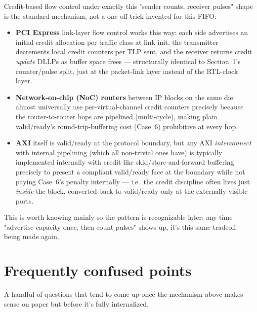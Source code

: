 \documentclass[12pt]{article}
\begin{document}
Credit-based flow control under exactly this "sender counts, receiver
pulses" shape is the standard mechanism, not a one-off trick invented for
this FIFO:

\begin{itemize}[leftmargin=1.4em]
  \item \textbf{PCI Express} link-layer flow control works this way: each
  side advertises an initial credit allocation per traffic class at link
  init, the transmitter decrements local credit counters per TLP sent, and
  the receiver returns credit \emph{update} DLLPs as buffer space frees —
  structurally identical to Section~1's counter/pulse split, just at the
  packet-link layer instead of the RTL-clock layer.
  \item \textbf{Network-on-chip (NoC) routers} between IP blocks on the
  same die almost universally use per-virtual-channel credit counters
  precisely because the router-to-router hops are pipelined (multi-cycle),
  making plain valid/ready's round-trip-buffering cost (Case~6) prohibitive
  at every hop.
  \item \textbf{AXI} itself is valid/ready at the protocol boundary, but
  any AXI \emph{interconnect} with internal pipelining (which all
  non-trivial ones have) is typically implemented internally with
  credit-like skid/store-and-forward buffering precisely to present a
  compliant valid/ready face at the boundary while not paying Case~6's
  penalty internally — i.e.\ the credit discipline often lives just
  \emph{inside} the block, converted back to valid/ready only at the
  externally visible ports.
\end{itemize}

This is worth knowing mainly so the pattern is recognizable later: any time
"advertise capacity once, then count pulses" shows up, it's this same
tradeoff being made again.

\clearpage
\section{Frequently confused points}

A handful of questions that tend to come up once the mechanism above makes
sense on paper but before it's fully internalized.
\end{document}
